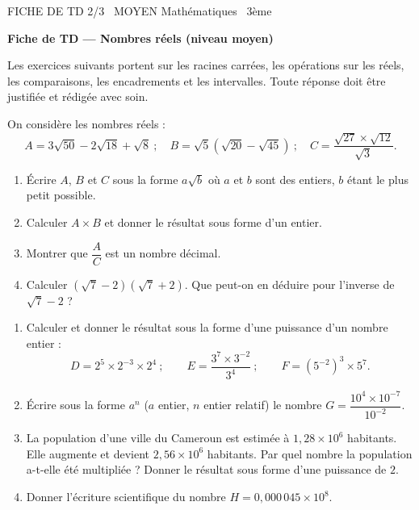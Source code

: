 \documentclass[11pt]{article}
\begin{document}
\begin{tcolorbox}[enhanced,colback=popink,colframe=popink,arc=10pt,boxrule=0pt,left=12pt,right=12pt,top=9pt,bottom=9pt]
{\color{white}\popxbold\small FICHE DE TD 2/3 \textbullet\ MOYEN \hfill Mathématiques \textbullet\ 3ème\par}
\end{tcolorbox}
\vspace{4pt}
\textbf{Fiche de TD — Nombres réels (niveau moyen)}

\smallskip
Les exercices suivants portent sur les racines carrées, les opérations sur les réels, les comparaisons, les encadrements et les intervalles. Toute réponse doit être justifiée et rédigée avec soin.

\begin{exercice}
On considère les nombres réels :
\[
A = 3\sqrt{50} - 2\sqrt{18} + \sqrt{8} \ ;\quad
B = \sqrt{5}\left(\sqrt{20} - \sqrt{45}\right) \ ;\quad
C = \dfrac{\sqrt{27} \times \sqrt{12}}{\sqrt{3}}.
\]
\begin{enumerate}
\item Écrire $A$, $B$ et $C$ sous la forme $a\sqrt{b}$ où $a$ et $b$ sont des entiers, $b$ étant le plus petit possible.
\item Calculer $A \times B$ et donner le résultat sous forme d'un entier.
\item Montrer que $\dfrac{A}{C}$ est un nombre décimal.
\item Calculer $(\sqrt{7} - 2)(\sqrt{7} + 2)$. Que peut-on en déduire pour l'inverse de $\sqrt{7} - 2$ ?
\end{enumerate}
\end{exercice}

\begin{exercice}
\begin{enumerate}
\item Calculer et donner le résultat sous la forme d'une puissance d'un nombre entier :
\[
D = 2^{5} \times 2^{-3} \times 2^{4} \ ;\qquad
E = \dfrac{3^{7} \times 3^{-2}}{3^{4}} \ ;\qquad
F = \left(5^{-2}\right)^{3} \times 5^{7}.
\]
\item Écrire sous la forme $a^{n}$ ($a$ entier, $n$ entier relatif) le nombre $G = \dfrac{10^{4} \times 10^{-7}}{10^{-2}}$.
\item La population d'une ville du Cameroun est estimée à $1{,}28 \times 10^{6}$ habitants. Elle augmente et devient $2{,}56 \times 10^{6}$ habitants. Par quel nombre la population a-t-elle été multipliée ? Donner le résultat sous forme d'une puissance de $2$.
\item Donner l'écriture scientifique du nombre $H = 0{,}000\,045 \times 10^{8}$.
\end{enumerate}
\end{exercice}
\end{document}
